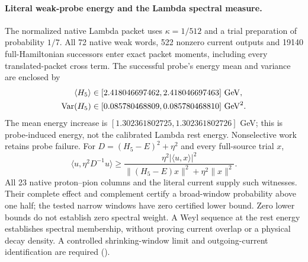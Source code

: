 \paragraph{Literal weak-probe energy and the Lambda spectral measure.}
The normalized native Lambda packet uses $\kappa=1/512$ and a trial
preparation of probability $1/7$. All 72 native weak words, 522 nonzero
current outputs and 19140 full-Hamiltonian successors enter exact packet
moments, including every translated-packet cross term. The successful
probe's energy mean and variance are enclosed by
\[
 \begin{aligned}
 \langle H_5\rangle&\in[2.418046697462,2.418046697463]\ {\rm GeV},\\
 \operatorname{Var}(H_5)&\in[0.085780468809,0.085780468810]\ {\rm GeV}^2.
 \end{aligned}
\]
The mean energy increase is
$[1.302361802725,1.302361802726]$ GeV; this is probe-induced energy,
not the calibrated Lambda rest energy. Nonselective work retains probe
failure. For $D=(H_5-E)^2+\eta^2$ and every full-source trial $x$,
\[
 \langle u,\eta^2D^{-1}u\rangle\ge
 \frac{\eta^2|\langle u,x\rangle|^2}
 {\|(H_5-E)x\|^2+\eta^2\|x\|^2}.
\]
All 23 native proton--pion columns and the literal current supply such
witnesses. Their complete effect and complement certify a broad-window
probability above one half; the tested narrow windows have zero certified
lower bound. Zero lower bounds do not establish zero spectral weight.
A Weyl sequence at the rest energy establishes spectral membership,
without proving current overlap or a physical decay density. A controlled
shrinking-window limit and outgoing-current identification are required
().

